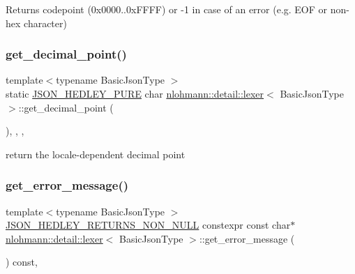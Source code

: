 \begin{DoxyReturn}{Returns}
codepoint (0x0000..0x\+F\+F\+FF) or -\/1 in case of an error (e.\+g. E\+OF or non-\/hex character) 
\end{DoxyReturn}
\mbox{\label{classnlohmann_1_1detail_1_1lexer_ae90334f30e7c12d5394c116bcfecac19}} 
\subsubsection{\texorpdfstring{get\_decimal\_point()}{get\_decimal\_point()}}
{\footnotesize\ttfamily template$<$typename Basic\+Json\+Type $>$ \\
static \mbox{\hyperlink{json_8hpp_af5c84b7d1a43361bdc14cc6941078000}{J\+S\+O\+N\+\_\+\+H\+E\+D\+L\+E\+Y\+\_\+\+P\+U\+RE}} char \mbox{\hyperlink{classnlohmann_1_1detail_1_1lexer}{nlohmann\+::detail\+::lexer}}$<$ Basic\+Json\+Type $>$\+::get\+\_\+decimal\+\_\+point (\begin{DoxyParamCaption}{ }\end{DoxyParamCaption})\hspace{0.3cm}{\ttfamily [inline]}, {\ttfamily [static]}, {\ttfamily [private]}, {\ttfamily [noexcept]}}



return the locale-\/dependent decimal point 

\mbox{\label{classnlohmann_1_1detail_1_1lexer_a3cead908f797ffa091bb67e90985739d}} 
\subsubsection{\texorpdfstring{get\_error\_message()}{get\_error\_message()}}
{\footnotesize\ttfamily template$<$typename Basic\+Json\+Type $>$ \\
\mbox{\hyperlink{json_8hpp_a5f2aaec3b681d0a72f7d6e90b70cdcd1}{J\+S\+O\+N\+\_\+\+H\+E\+D\+L\+E\+Y\+\_\+\+R\+E\+T\+U\+R\+N\+S\+\_\+\+N\+O\+N\+\_\+\+N\+U\+LL}} constexpr const char$\ast$ \mbox{\hyperlink{classnlohmann_1_1detail_1_1lexer}{nlohmann\+::detail\+::lexer}}$<$ Basic\+Json\+Type $>$\+::get\+\_\+error\+\_\+message (\begin{DoxyParamCaption}{ }\end{DoxyParamCaption}) const\hspace{0.3cm}{\ttfamily [inline]}, {\ttfamily [noexcept]}}



